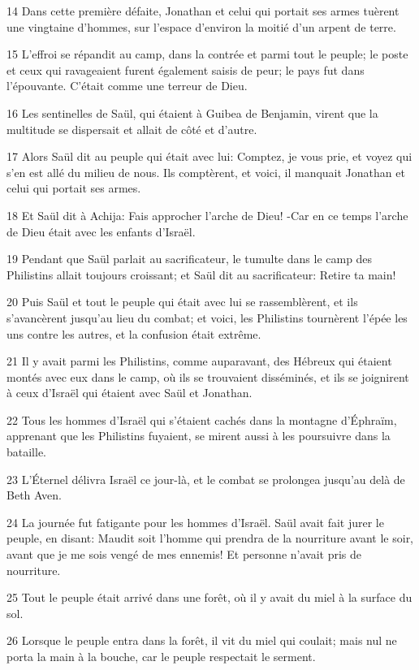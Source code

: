 \par 14 Dans cette première défaite, Jonathan et celui qui portait ses armes tuèrent une vingtaine d'hommes, sur l'espace d'environ la moitié d'un arpent de terre.
\par 15 L'effroi se répandit au camp, dans la contrée et parmi tout le peuple; le poste et ceux qui ravageaient furent également saisis de peur; le pays fut dans l'épouvante. C'était comme une terreur de Dieu.
\par 16 Les sentinelles de Saül, qui étaient à Guibea de Benjamin, virent que la multitude se dispersait et allait de côté et d'autre.
\par 17 Alors Saül dit au peuple qui était avec lui: Comptez, je vous prie, et voyez qui s'en est allé du milieu de nous. Ils comptèrent, et voici, il manquait Jonathan et celui qui portait ses armes.
\par 18 Et Saül dit à Achija: Fais approcher l'arche de Dieu! -Car en ce temps l'arche de Dieu était avec les enfants d'Israël.
\par 19 Pendant que Saül parlait au sacrificateur, le tumulte dans le camp des Philistins allait toujours croissant; et Saül dit au sacrificateur: Retire ta main!
\par 20 Puis Saül et tout le peuple qui était avec lui se rassemblèrent, et ils s'avancèrent jusqu'au lieu du combat; et voici, les Philistins tournèrent l'épée les uns contre les autres, et la confusion était extrême.
\par 21 Il y avait parmi les Philistins, comme auparavant, des Hébreux qui étaient montés avec eux dans le camp, où ils se trouvaient disséminés, et ils se joignirent à ceux d'Israël qui étaient avec Saül et Jonathan.
\par 22 Tous les hommes d'Israël qui s'étaient cachés dans la montagne d'Éphraïm, apprenant que les Philistins fuyaient, se mirent aussi à les poursuivre dans la bataille.
\par 23 L'Éternel délivra Israël ce jour-là, et le combat se prolongea jusqu'au delà de Beth Aven.
\par 24 La journée fut fatigante pour les hommes d'Israël. Saül avait fait jurer le peuple, en disant: Maudit soit l'homme qui prendra de la nourriture avant le soir, avant que je me sois vengé de mes ennemis! Et personne n'avait pris de nourriture.
\par 25 Tout le peuple était arrivé dans une forêt, où il y avait du miel à la surface du sol.
\par 26 Lorsque le peuple entra dans la forêt, il vit du miel qui coulait; mais nul ne porta la main à la bouche, car le peuple respectait le serment.
